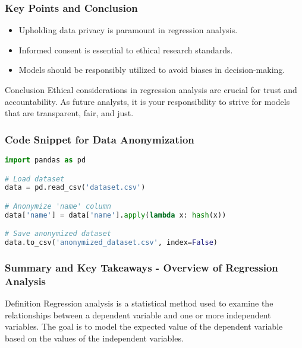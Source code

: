 \documentclass{beamer}
\begin{document}
\begin{frame}[fragile]
    \frametitle{Key Points and Conclusion}
    \begin{itemize}
        \item Upholding data privacy is paramount in regression analysis.
        \item Informed consent is essential to ethical research standards.
        \item Models should be responsibly utilized to avoid biases in decision-making.
    \end{itemize}

    \begin{block}{Conclusion}
        Ethical considerations in regression analysis are crucial for trust and accountability. As future analysts, it is your responsibility to strive for models that are transparent, fair, and just.
    \end{block}
\end{frame}

\begin{frame}[fragile]
    \frametitle{Code Snippet for Data Anonymization}
    \begin{lstlisting}[language=Python]
import pandas as pd

# Load dataset
data = pd.read_csv('dataset.csv')

# Anonymize 'name' column
data['name'] = data['name'].apply(lambda x: hash(x))

# Save anonymized dataset
data.to_csv('anonymized_dataset.csv', index=False)
    \end{lstlisting}
\end{frame}

\begin{frame}[fragile]
    \frametitle{Summary and Key Takeaways - Overview of Regression Analysis}
    \begin{block}{Definition}
        Regression analysis is a statistical method used to examine the relationships between a dependent variable and one or more independent variables. The goal is to model the expected value of the dependent variable based on the values of the independent variables.
    \end{block}
\end{frame}
\end{document}
